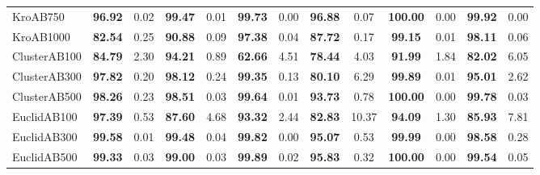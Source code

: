 \begin{table}[h]
\begin{threeparttable}
\begin{tabular}{lcccccccccccc}
            KroAB750                      & \textbf{96.92}                & 0.02                           & \textbf{99.47}                 & 0.01                     & \textbf{99.73}              & 0.00                      & \textbf{96.88}           & 0.07   & \textbf{100.00} & 0.00   & \textbf{99.92}  & 0.00  \\
            KroAB1000                     & \textbf{82.54}                & 0.25                           & \textbf{90.88}                 & 0.09                     & \textbf{97.38}              & 0.04                      & \textbf{87.72}           & 0.17   & \textbf{99.15}  & 0.01   & \textbf{98.11}  & 0.06  \\

            ClusterAB100                  & \textbf{84.79}                & 2.30                           & \textbf{94.21}                 & 0.89                     & \textbf{62.66}              & 4.51                      & \textbf{78.44}           & 4.03   & \textbf{91.99}  & 1.84   & \textbf{82.02}  & 6.05  \\
            ClusterAB300                  & \textbf{97.82}                & 0.20                           & \textbf{98.12}                 & 0.24                     & \textbf{99.35}              & 0.13                      & \textbf{80.10}           & 6.29   & \textbf{99.89}  & 0.01   & \textbf{95.01}  & 2.62  \\
            ClusterAB500                  & \textbf{98.26}                & 0.23                           & \textbf{98.51}                 & 0.03                     & \textbf{99.64}              & 0.01                      & \textbf{93.73}           & 0.78   & \textbf{100.00} & 0.00   & \textbf{99.78}  & 0.03  \\

            EuclidAB100                   & \textbf{97.39}                & 0.53                           & \textbf{87.60}                 & 4.68                     & \textbf{93.32}              & 2.44                      & \textbf{82.83}           & 10.37  & \textbf{94.09}  & 1.30   & \textbf{85.93}  & 7.81  \\
            EuclidAB300                   & \textbf{99.58}                & 0.01                           & \textbf{99.48}                 & 0.04                     & \textbf{99.82}              & 0.00                      & \textbf{95.07}           & 0.53   & \textbf{99.99}  & 0.00   & \textbf{98.58}  & 0.28  \\
            EuclidAB500                   & \textbf{99.33}                & 0.03                           & \textbf{99.00}                 & 0.03                     & \textbf{99.89}              & 0.02                      & \textbf{95.83}           & 0.32   & \textbf{100.00} & 0.00   & \textbf{99.54}  & 0.05  \\


\end{tabular}
\end{threeparttable}
\end{table}
